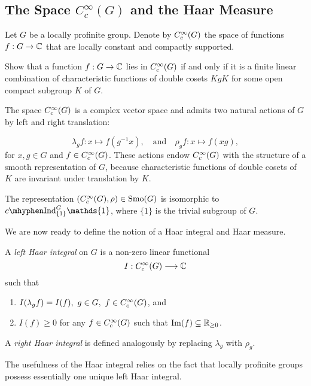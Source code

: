 \subsection{The Space \texorpdfstring{$C_c^{\infty}(G)$}{TEXT} and the Haar Measure}

Let $G$ be a locally profinite group. Denote by $C_c^{\infty}(G)$ the space of functions $f:G\to\mathbb{C}$ that are locally constant and compactly supported. 

\begin{exercise}
    Show that a function $f:G\to\mathbb{C}$ lies in $C_c^{\infty}(G)$ if and only if it is a finite linear combination of characteristic functions of double cosets $KgK$ for some open compact subgroup $K$ of $G$.
\end{exercise}

The space $C_c^{\infty}(G)$ is a complex vector space and admits two natural actions of $G$ by left and right translation:

$$\lambda_g f:x\longmapsto f(g^{-1}x),\quad\text{and}\quad \rho_g f:x\longmapsto f(xg),$$
for $x,g\in G$ and $f\in C_c^{\infty}(G)$. These actions endow $C_c^{\infty}(G)$ with the structure of a smooth representation of $G$, because characteristic functions of double cosets of $K$ are invariant under translation by $K$. 

\begin{rem}
    The representation $(C_c^{\infty}(G),\rho)\in\mathrm{Smo}(G)$ is isomorphic to $\cInd_{\{1\}}^G\mathds{1}$, where $\{1\}$ is the trivial subgroup of $G$.  
\end{rem}

We are now ready to define the notion of a Haar integral and Haar measure.

\begin{defn}
    A \textit{left Haar integral} on $G$ is a non-zero linear functional 
    $$I:C_c^{\infty}(G)\longrightarrow \mathbb{C}$$
    such that
    \begin{enumerate}[(1)]
        \item $I(\lambda_g f)=I(f),\ g\in G,\ f\in\CG$, and
        \item $I(f)\geq 0$ for any $f\in C_c^{\infty}(G)$ such that $\mathrm{Im}(f)\subseteq\mathbb{R}_{\geq0}$.
    \end{enumerate}
    A \textit{right Haar integral} is defined analogously by replacing $\lambda_g$ with $\rho_g$.
\end{defn}

The usefulness of the Haar integral relies on the fact that locally profinite groups possess essentially one unique left Haar integral.

